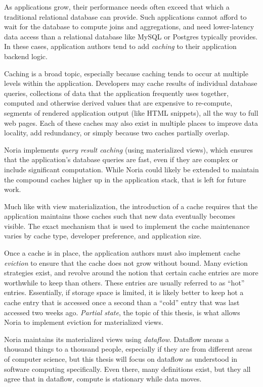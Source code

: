 
As applications grow, their performance needs often exceed that which a
traditional relational database can provide. Such applications cannot afford to
wait for the database to compute joins and aggregations, and need lower-latency
data access than a relational database like MySQL or Postgres typically
provides. In these cases, application authors tend to add \textit{caching} to
their application backend logic.

Caching is a broad topic, especially because caching tends to occur at multiple
levels within the application. Developers may cache results of individual
database queries, collections of data that the application frequently uses
together, computed and otherwise derived values that are expensive to
re-compute, segments of rendered application output (like HTML snippets), all
the way to full web pages. Each of these caches may also exist in multiple
places to improve data locality, add redundancy, or simply because two caches
partially overlap.

Noria implements \textit{query result caching} (using materialized views), which
ensures that the application's database queries are fast, even if they are
complex or include significant computation. While Noria could likely be extended
to maintain the compound caches higher up in the application stack, that is left
for future work.

Much like with view materialization, the introduction of a cache requires that
the application maintains those caches such that new data eventually becomes
visible. The exact mechanism that is used to implement the cache maintenance
varies by cache type, developer preference, and application size.

Once a cache is in place, the application authors must also implement cache
\textit{eviction} to ensure that the cache does not grow without bound. Many
eviction strategies exist, and revolve around the notion that certain cache
entries are more worthwhile to keep than others. These entries are usually
referred to as ``hot'' entries. Essentially, if storage space is limited, it is
likely better to keep hot a cache entry that is accessed once a second than a
``cold'' entry that was last accessed two weeks ago. \textit{Partial state}, the
topic of this thesis, is what allows Noria to implement eviction for
materialized views.


Noria maintains its materialized views using \textit{dataflow}. Dataflow means a
thousand things to a thousand people, especially if they are from different
areas of computer science, but this thesis will focus on dataflow as understood
in software computing specifically. Even there, many definitions exist, but they
all agree that in dataflow, compute is stationary while data moves.

